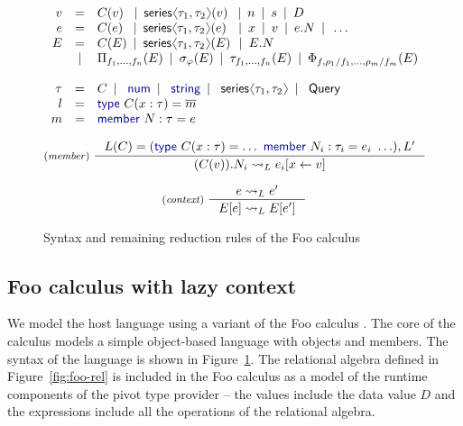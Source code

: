 \documentclass[a4paper,UKenglish]{lipics-v2016}
\theoremstyle{plain}
\theoremstyle{definition}
\newcommand{\langl}{\begin{picture}(4.5,7)
\put(1.1,2.5){\rotatebox{60}{\line(1,0){5.5}}}
\put(1.1,2.5){\rotatebox{300}{\line(1,0){5.5}}}
\end{picture}}
\newcommand{\rangl}{\begin{picture}(4.5,7)
\put(.9,2.5){\rotatebox{120}{\line(1,0){5.5}}}
\put(.9,2.5){\rotatebox{240}{\line(1,0){5.5}}}
\end{picture}}
\newcommand{\lsep}{~\,|\,~}
\newcommand{\kvd}[1]{\textnormal{\textcolor{kvdclr}{\sffamily #1}}}
\newcommand{\ident}[1]{\textnormal{\sffamily #1}}
\begin{document}
\begin{figure}
\vspace{-1em}
\begin{equation*}
\begin{array}{rcl}
  v &=& C(v)\,\, \lsep \ident{series}\langl \tau_1, \tau_2 \rangl(v)\; \lsep n \lsep s \lsep D \\
  e &=& C(e)\,\, \lsep \ident{series}\langl \tau_1, \tau_2 \rangl(e)\;\, \lsep x \lsep v \lsep e.N \lsep \ldots\\
  E &=& C(E) \lsep \ident{series}\langl \tau_1, \tau_2 \rangl(E)\, \lsep E.N \\
    &|& \Pi_{f_1, \ldots, f_n}(E) \lsep \sigma_\varphi(E) \lsep \tau_{f_1, \ldots, f_n}(E) \lsep \Phi_{f, \rho_1/f_1, \ldots, \rho_m/f_m} (E) \\
    \\
 \tau &=& C \lsep \kvd{num} \lsep \kvd{string} \lsep \ident{series}\langl \tau_1, \tau_2 \rangl \lsep \ident{Query}\\
 l &=& \kvd{type}~C(x:\tau) = \overline{m} \\
 m &=& \kvd{member}~N:\tau= e
\end{array}
\end{equation*}
\vspace{-1.5em}

\[
\inference[(\emph{member})~]
{ L(C) = (\kvd{type}~C(x:\tau)= \ldots~\kvd{member}~N_i : \tau_i = e_i~\ldots), L'}
{ (C(v)).N_i \leadsto_L e_i[x \leftarrow v] }\\
\]
\vspace{-3em}

\[
\inference[(\emph{context})~]
{e \leadsto_L e'}
{E[e] \leadsto_L E[e']}
\]
\caption{Syntax and remaining reduction rules of the Foo calculus}
\label{fig:foo-syntax}
\end{figure}


\subsection{Foo calculus with lazy context}
\label{sec:foo-foo}

We model the host language using a variant of the Foo calculus \cite{fsdata}. The core of the calculus models
a simple object-based language with objects and members. The syntax of the language is shown in
Figure~\ref{fig:foo-syntax}. The relational algebra defined in Figure~\ref{fig:foo-rel} is included
in the Foo calculus as a model of the runtime components of the pivot type provider -- the values
include the data value $D$ and the expressions include all the operations of the relational algebra.
\end{document}
